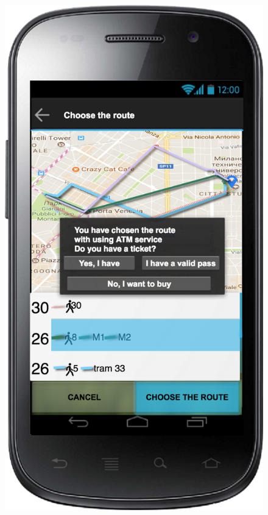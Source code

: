 \documentclass[a4paper,leqno]{article}
\begin{document}
\begin{figure}
	\vspace{3.5 cm}
	
	\begin{minipage}[!h]{0.45\linewidth}
		\centering
		\includegraphics[scale = 0.15]{buyTicket.png}
	\end{minipage}

\end{figure}
\end{document}
